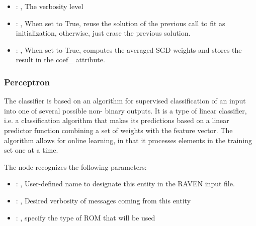 \begin{itemize}
    \item {}: , 
      The verbosity level

    \item {}: , 
      When set to True, reuse the solution of the previous call
      to fit as initialization, otherwise, just erase the previous solution.

    \item {}: , 
      When set to True, computes the averaged SGD weights and
      stores the result in the coef\_ attribute.
  \end{itemize}


\subsubsection{Perceptron}
  The  classifier is based on an                         algorithm for
  supervised classification of                         an input into one of several possible non-
  binary outputs.                         It is a type of linear classifier, i.e. a classification
  algorithm that makes                         its predictions based on a linear predictor function
  combining a set of weights                         with the feature vector.
  The algorithm allows for online learning, in that it processes elements in the
  training set one at a time.                         

  The  node recognizes the following parameters:
    \begin{itemize}
      \item {}: , 
        User-defined name to designate this entity in the RAVEN input file.
      \item {}: , 
        Desired verbosity of messages coming from this entity
      \item {}: , 
        specify the type of ROM that will be used
  \end{itemize}

